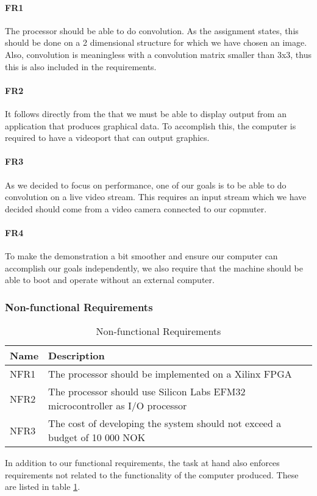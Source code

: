 \paragraph{FR1}
The processor should be able to do convolution.
As the assignment states, this should be done on a 2 dimensional structure for which we have chosen an image.
Also, convolution is meaningless with a convolution matrix smaller than 3x3, thus this is also included in the requirements.

\paragraph{FR2}
It follows directly from the  that we must be able to display output from an application that produces graphical data.
To accomplish this, the computer is required to have a videoport that can output graphics.

\paragraph{FR3}
As we decided to focus on performance, one of our goals is to be able to do convolution on a live video stream.
This requires an input stream which we have decided should come from a video camera connected to our copmuter.

\paragraph{FR4}
To make the demonstration a bit smoother and ensure our computer can accomplish our goals independently, we also require that the machine should be able to boot and operate without an external computer.


\subsubsection{Non-functional Requirements}

\begin{table}[]
    \centering
    \label{tab:non-functional-requirements}
    \begin{tabular}{lp{12cm}l}
        Name & Description \\
        \hline
        NFR1 &
            The processor should be implemented on a Xilinx FPGA \\
        NFR2 &
            The processor should use Silicon Labs EFM32 microcontroller as I/O processor \\
        NFR3 &
            The cost of developing the system should not exceed a budget of 10 000 NOK \\
    \end{tabular}
    \caption{Non-functional Requirements}
\end{table}

In addition to our functional requirements, the task at hand also enforces requirements not related to the functionality of the computer produced. These are listed in table \ref{tab:non-functional-requirements}.

